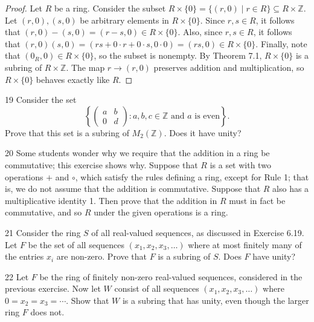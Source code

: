 \begin{proof}
    Let $R$ be a ring. Consider the subset $R \times \{0\} = \{(r,0) \mid r \in R\} \subseteq R \times \mathbb{Z}$.  
    Let $(r,0), (s,0)$ be arbitrary elements in $R \times \{0\}$.  
    Since $r, s \in R$, it follows that $(r,0) - (s,0) = (r - s, 0) \in R \times \{0\}$.  
    Also, since $r, s \in R$, it follows that $(r,0)(s,0) = (rs + 0\cdot r + 0\cdot s, 0\cdot 0) = (rs, 0) \in R \times \{0\}$.  
    Finally, note that $(0_R, 0) \in R \times \{0\}$, so the subset is nonempty.  
    By Theorem 7.1, $R \times \{0\}$ is a subring of $R \times \mathbb{Z}$.  
    The map $r \longrightarrow (r,0)$ preserves addition and multiplication, so $R \times \{0\}$ behaves exactly like $R$.  
\end{proof}

\begin{problem}{19}
    Consider the set
    \[\left\{\begin{pmatrix} a & b \\ 0 & d \end{pmatrix} : a, b, c \in \mathbb{Z} \text{ and } a \text{ is even}\right\}.\]
    Prove that this set is a subring of $M_2(\mathbb{Z})$. Does it have unity?
\end{problem}
\unsolved

\begin{problem}{20}
    Some students wonder why we require that the addition in a ring be commutative;
    this exercise shows why. Suppose that $R$ is a set with two operations $+$ and
    $\circ$, which satisfy the rules defining a ring, except for Rule 1; that is, we do
    not assume that the addition is commutative. Suppose that $R$ also has a
    multiplicative identity 1. Then prove that the addition in $R$ must in fact be
    commutative, and so $R$ under the given operations is a ring.
\end{problem}
\unsolved

\begin{problem}{21}
    Consider the ring $S$ of all real-valued sequences, as discussed in Exercise 6.19.
    Let $F$ be the set of all sequences $(x_1, x_2, x_3, \ldots)$ where at most finitely
    many of the entries $x_i$ are non-zero. Prove that $F$ is a subring of $S$. Does $F$
    have unity?
\end{problem}
\unsolved

\begin{problem}{22}
    Let $F$ be the ring of finitely non-zero real-valued sequences, considered in the
    previous exercise. Now let $W$ consist of all sequences $(x_1, x_2, x_3, \ldots)$
    where $0 = x_2 = x_3 = \cdots$. Show that $W$ is a subring that has unity, even
    though the larger ring $F$ does not.
\end{problem}
\unsolved

